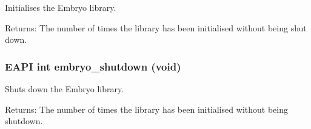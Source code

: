 Initialises the Embryo library. 

\begin{Desc}
\item[Returns:]The number of times the library has been initialised without being shut down. \end{Desc}
\hypertarget{group__Embryo__Library__Group_g0e9ce7c1cc694db3195fdf754cd7374a}{
\subsubsection{\setlength{\rightskip}{0pt plus 5cm}EAPI int embryo\_\-shutdown (void)}}
\label{group__Embryo__Library__Group_g0e9ce7c1cc694db3195fdf754cd7374a}


Shuts down the Embryo library. 

\begin{Desc}
\item[Returns:]The number of times the library has been initialised without being shutdown. \end{Desc}

